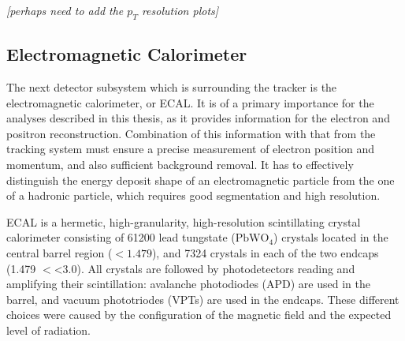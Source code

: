 \textit{[perhaps need to add the $p_T$ resolution plots]}

\subsection{Electromagnetic Calorimeter}
The next detector subsystem which is surrounding the tracker is the electromagnetic calorimeter, or ECAL. It is of a
primary importance for the analyses described in this thesis, as it provides information for the electron and positron
reconstruction. Combination of this information with that from the tracking system must ensure a precise measurement of
electron position and momentum, and also sufficient background removal. It has to effectively distinguish the energy
deposit shape of an electromagnetic particle from the one of a hadronic particle, which requires good segmentation and
high resolution.

ECAL is a hermetic, high-granularity, high-resolution scintillating crystal calorimeter consisting of \num{61200} lead
tungstate ($\textrm{PbWO}_4$) crystals located in the central barrel region (\abs\eta $<1.479$), and \num{7324} crystals
in each of the two endcaps (\num{1.479} $<$\abs\eta\num{<3.0}). All crystals are followed by photodetectors reading and
amplifying their scintillation: avalanche photodiodes (APD) are used in the barrel, and vacuum phototriodes (VPTs) are
used in the endcaps. These different choices were caused by the configuration of the magnetic field and the expected
level of radiation.

